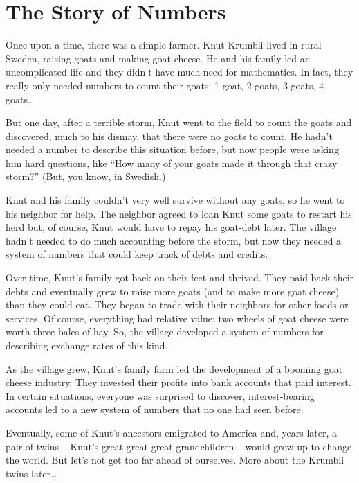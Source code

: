 \section{The Story of Numbers}
\label{sec:storyofnumbers}

\newenvironment{story}
{\begin{slshape}}
{\end{slshape}}

\begin{story}
Once upon a time, there was a simple farmer. Knut Krumbli lived in rural Sweden, raising goats and making goat cheese. He and his family led an uncomplicated life and they didn't have much need for mathematics. In fact, they really only needed numbers to count their goats: 1 goat, 2 goats, 3 goats, 4 goats\ldots

But one day, after a terrible storm, Knut went to the field to count the goats and discovered, much to his dismay, that there were no goats to count. He hadn't needed a number to describe this situation before, but now people were asking him hard questions, like ``How many of your goats made it through that crazy storm?'' (But, you know, in Swedish.)

Knut and his family couldn't very well survive without any goats, so he went to his neighbor for help. The neighbor agreed to loan Knut some goats to restart his herd but, of course, Knut would have to repay his goat-debt later. The village hadn't needed to do much accounting before the storm, but now they needed a system of numbers that could keep track of debts and credits.

Over time, Knut's family got back on their feet and thrived. They paid back their debts and eventually grew to raise more goats (and to make more goat cheese) than they could eat. They began to trade with their neighbors for other foods or services. Of course, everything had relative value: two wheels of goat cheese were worth three bales of hay. So, the village developed a system of numbers for describing exchange rates of this kind.

As the village grew, Knut's family farm led the development of a booming goat cheese industry. They invested their profits into bank accounts that paid interest. In certain situations, everyone was surprised to discover, interest-bearing accounts led to a new system of numbers that no one had seen before.

Eventually, some of Knut's ancestors emigrated to America and, years later, a pair of twins -- Knut's great-great-great-grandchildren -- would grow up to change the world. But let's not get too far ahead of ourselves. More about the Krumbli twins later\ldots
\end{story}

